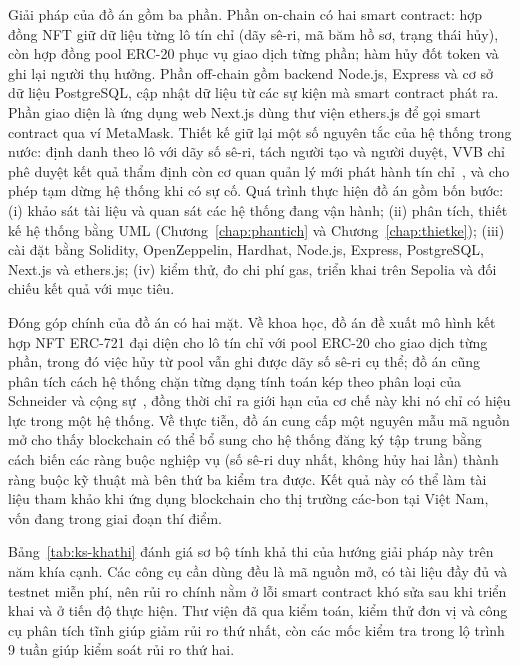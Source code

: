 Giải pháp của đồ án gồm ba phần. Phần on-chain có hai smart contract: hợp đồng NFT giữ dữ liệu từng lô tín chỉ (dãy sê-ri, mã băm hồ sơ, trạng thái hủy), còn hợp đồng pool ERC-20 phục vụ giao dịch từng phần; hàm hủy đốt token và ghi lại người thụ hưởng. Phần off-chain gồm backend Node.js, Express và cơ sở dữ liệu PostgreSQL, cập nhật dữ liệu từ các sự kiện mà smart contract phát ra. Phần giao diện là ứng dụng web Next.js dùng thư viện ethers.js để gọi smart contract qua ví MetaMask. Thiết kế giữ lại một số nguyên tắc của hệ thống trong nước: định danh theo lô với dãy số sê-ri, tách người tạo và người duyệt, VVB chỉ phê duyệt kết quả thẩm định còn cơ quan quản lý mới phát hành tín chỉ~\cite{mae2025qd2935,vietnam2026nghidinh396}, và cho phép tạm dừng hệ thống khi có sự cố. Quá trình thực hiện đồ án gồm bốn bước: (i) khảo sát tài liệu và quan sát các hệ thống đang vận hành; (ii) phân tích, thiết kế hệ thống bằng UML (Chương~\ref{chap:phantich} và Chương~\ref{chap:thietke}); (iii) cài đặt bằng Solidity, OpenZeppelin, Hardhat, Node.js, Express, PostgreSQL, Next.js và ethers.js; (iv) kiểm thử, đo chi phí gas, triển khai trên Sepolia và đối chiếu kết quả với mục tiêu.

Đóng góp chính của đồ án có hai mặt. Về khoa học, đồ án đề xuất mô hình kết hợp NFT ERC-721 đại diện cho lô tín chỉ với pool ERC-20 cho giao dịch từng phần, trong đó việc hủy từ pool vẫn ghi được dãy số sê-ri cụ thể; đồ án cũng phân tích cách hệ thống chặn từng dạng tính toán kép theo phân loại của Schneider và cộng sự~\cite{schneider2019double}, đồng thời chỉ ra giới hạn của cơ chế này khi nó chỉ có hiệu lực trong một hệ thống. Về thực tiễn, đồ án cung cấp một nguyên mẫu mã nguồn mở cho thấy blockchain có thể bổ sung cho hệ thống đăng ký tập trung bằng cách biến các ràng buộc nghiệp vụ (số sê-ri duy nhất, không hủy hai lần) thành ràng buộc kỹ thuật mà bên thứ ba kiểm tra được. Kết quả này có thể làm tài liệu tham khảo khi ứng dụng blockchain cho thị trường các-bon tại Việt Nam, vốn đang trong giai đoạn thí điểm.

Bảng~\ref{tab:ks-khathi} đánh giá sơ bộ tính khả thi của hướng giải pháp này trên năm khía cạnh. Các công cụ cần dùng đều là mã nguồn mở, có tài liệu đầy đủ và testnet miễn phí, nên rủi ro chính nằm ở lỗi smart contract khó sửa sau khi triển khai và ở tiến độ thực hiện. Thư viện đã qua kiểm toán, kiểm thử đơn vị và công cụ phân tích tĩnh giúp giảm rủi ro thứ nhất, còn các mốc kiểm tra trong lộ trình 9 tuần giúp kiểm soát rủi ro thứ hai.

